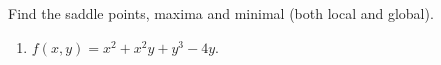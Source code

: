 Find the saddle points, maxima and minimal (both local and global).

\begin{enumerate}[ref={\fcProblemRef}]
\item \label{problemextremax^2+x^2y+y^3-2y} $f(x,y)=x^2+ x^2y+y^3-4y$.

\end{enumerate}